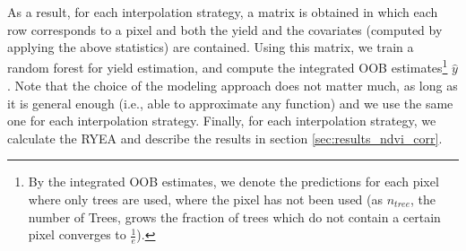 {{        As a result, for each interpolation strategy, a matrix is obtained in which each row corresponds to a pixel and both the yield and the covariates (computed by applying the above statistics) are contained.
        Using this matrix, we train a random forest for yield estimation, and compute the integrated OOB estimates\footnote{By the integrated OOB estimates, we denote the predictions for each pixel where only trees are used, where the pixel has not been used (as $n_{tree}$, the number of Trees, grows the fraction of trees which do not contain a certain pixel converges to $\frac{1}{e}$).} $\hat y$. Note that the choice of the modeling approach does not matter much, as long as it is general enough (i.e., able to approximate any function) and we use the same one for each interpolation strategy. 
        Finally, for each interpolation strategy, we calculate the RYEA and describe the results in section \ref{sec:results_ndvi_corr}.
    }

    
    
    
}



